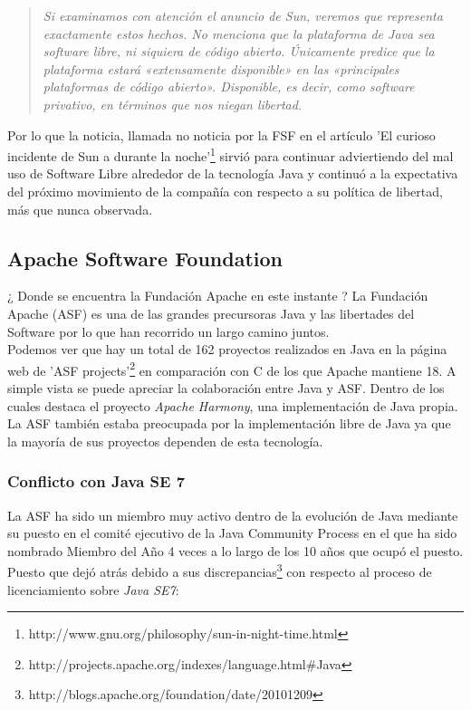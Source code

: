 \documentclass[11pt]{scrartcl}
\begin{document}
\begin{quotation}
    \emph{Si examinamos con atención el anuncio de Sun, veremos que representa exactamente estos hechos. No menciona que la plataforma de Java sea software libre, ni siquiera de código abierto. Únicamente predice que la plataforma estará «extensamente disponible» en las «principales plataformas de código abierto». Disponible, es decir, como software privativo, en términos que nos niegan libertad.}
\end{quotation}

Por lo que la noticia, llamada no noticia por la FSF en el artículo 'El curioso incidente de Sun a durante la noche'\footnote{http://www.gnu.org/philosophy/sun-in-night-time.html} sirvió para continuar adviertiendo del mal uso de Software Libre alrededor de la tecnología Java y continuó a la expectativa del próximo movimiento de la compañía con respecto a su política de libertad, más que nunca observada.

\subsection{Apache Software Foundation}

¿ Donde se encuentra la Fundación Apache en este instante ? La Fundación Apache (ASF) es una de las grandes precursoras Java y las libertades del Software por lo que han recorrido un largo camino juntos.\\
Podemos ver que hay un total de 162 proyectos realizados en Java en la página web de 'ASF projects'\footnote{http://projects.apache.org/indexes/language.html\#Java} en comparación con C de los que Apache mantiene 18. A simple vista se puede apreciar la colaboración entre Java y ASF. Dentro de los cuales destaca el proyecto \emph{Apache Harmony}, una implementación de Java propia. La ASF también estaba preocupada por la implementación libre de Java ya que la mayoría de sus proyectos dependen de esta tecnología.

\subsubsection{Conflicto con Java SE 7}

La ASF ha sido un miembro muy activo dentro de la evolución de Java mediante su puesto en el comité ejecutivo de la Java Community Process en el que ha sido nombrado Miembro del Año 4 veces a lo largo de los 10 años que ocupó el puesto. Puesto que dejó atrás debido a sus discrepancias\footnote{http://blogs.apache.org/foundation/date/20101209} con respecto al proceso de licenciamiento sobre \emph{Java SE7}:
\end{document}
